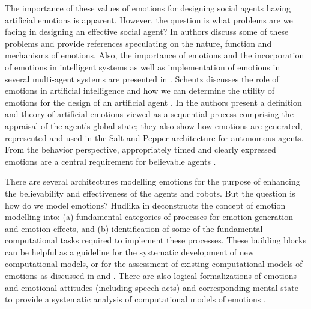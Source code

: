 \documentclass[12pt]{report}
\begin{document}
The importance of these values of emotions for designing social agents having
artificial emotions is apparent. However, the question is what problems are we
facing in designing an effective social agent? In
\cite{freitas:artificial-emotions-ready} authors discuss some of these problems
and provide references speculating on the nature, function and mechanisms of
emotions. Also, the importance of emotions and the incorporation of emotions in
intelligent systems as well as implementation of emotions in several multi-agent
systems are presented in \cite{miranda:emotions-humans-ai}. Scheutz discusses
the role of emotions in artificial intelligence and how we can determine the
utility of emotions for the design of an artificial agent
\cite{scheutz:emotion-role}. In \cite{botelho:machinery-emotions} the authors
present a definition and theory of artificial emotions viewed as a sequential
process comprising the appraisal of the agent's global state; they also show how
emotions are generated, represented and used in the Salt and Pepper architecture
for autonomous agents. From the behavior perspective, appropriately timed and
clearly expressed emotions are a central requirement for believable agents
\cite{bates:emotion-roles}.

There are several architectures modelling emotions for the purpose of enhancing
the believability and effectiveness of the agents and robots. But the question
is how do we model emotions? Hudlika in \cite{hudlicka:modeling-emotion}
deconstructs the concept of emotion modelling into: (a) fundamental categories
of processes for emotion generation and emotion effects, and (b) identification
of some of the fundamental computational tasks required to implement these
processes. These building blocks can be helpful as a guideline for the
systematic development of new computational models, or for the assessment of
existing computational models of emotions as discussed in
\cite{lin:computational-models-emotion} and \cite{marsella:computational}. There
are also logical formalizations of emotions and emotional attitudes (including
speech acts) and corresponding mental state to provide a systematic analysis
of computational models of emotions \cite{adam:logical-formalization,
grant:model-intention-formation, guiraud:emotions-formalization-speech-acts}.
\end{document}
